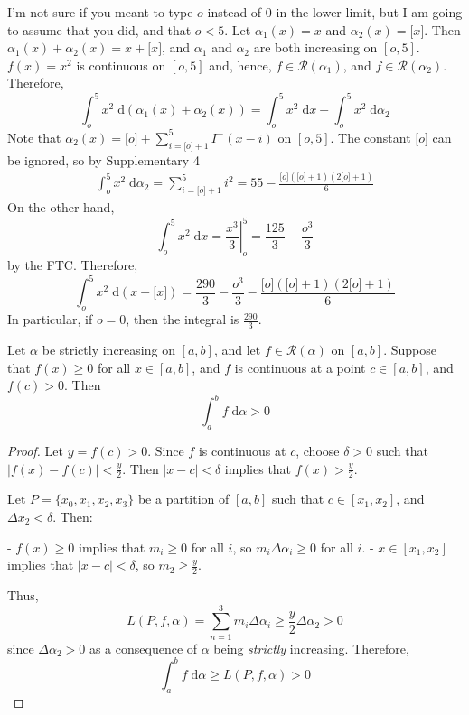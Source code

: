 \documentclass{homework}
\begin{document}
	
	I'm not sure if you meant to type $o$ instead of $0$ in the lower limit, but I am going to assume that you did, and that $o < 5$. Let $\alpha_1(x) = x$ and $\alpha_2(x) = \lbrack x \rbrack$. Then $\alpha_1(x) + \alpha_2(x) = x + \lbrack x \rbrack$, and $\alpha_1$ and $\alpha_2$ are both increasing on $[o, 5]$. $f(x) = x^2$ is continuous on $[o,5]$ and, hence, $f \in \mathscr{R}(\alpha_1)$, and $f \in\mathscr{R}(\alpha_2)$. Therefore,
	$$
	\int_o^5x^2\;\text{d}(\alpha_1(x) + \alpha_2(x)) = \int_o^5x^2\;\text{d}x + \int_o^5x^2\;\text{d}\alpha_2
	$$
	Note that $\alpha_2(x) = \lbrack o \rbrack + \sum_{i=\lbrack o \rbrack + 1}^5 I^+(x-i)$ on $[o,5]$. The constant $\lbrack o \rbrack$ can be ignored, so by Supplementary 4
	$$
	\begin{aligned}
		\int_o^5x^2\;\text{d}\alpha_2 = \sum_{i=\lbrack o\rbrack + 1}^5 i^2 =  55 - \frac{\lbrack o \rbrack(\lbrack o \rbrack + 1)(2\lbrack o \rbrack + 1)}{6}
	\end{aligned}
	$$
	On the other hand,
	$$
	\int_o^5x^2\;\text{d}x = \left.\frac{x^3}{3}\right|_o^5 = \frac{125}{3} - \frac{o^3}{3}
	$$
	by the FTC. Therefore,
	$$
	\int_o^5x^2\;\text{d}(x + \lbrack x \rbrack) = \frac{290}{3} - \frac{o^3}{3} - \frac{\lbrack o \rbrack(\lbrack o \rbrack + 1)(2\lbrack o \rbrack + 1)}{6}
	$$
	In particular, if $o = 0$, then the integral is $\frac{290}{3}$.
	
	
	Let $\alpha$ be strictly increasing on $[a,b]$, and let $f \in \mathscr{R}(\alpha)$ on $[a,b]$. Suppose that $f(x) \ge 0$ for all $x \in [a,b]$, and $f$ is continuous at a point $c \in [a,b]$, and $f(c) > 0$. Then
	$$
	\int_a^bf\;\text{d}\alpha > 0
	$$
	\begin{proof}
		Let $y=  f(c) > 0$. Since $f$ is continuous at $c$, choose $\delta > 0$ such that $|f(x) - f(c)| < \frac{y}{2}$. Then $|x - c| < \delta$ implies that $f(x) > \frac{y}{2}$.
		
		Let $P = \{x_0, x_1,x_2,x_3\}$ be a partition of $[a,b]$ such that $c \in[x_1, x_2]$, and $\Delta x_2 < \delta$. Then:
		
		- $f(x) \ge 0$ implies that $m_i \ge 0$ for all $i$, so $m_i\Delta \alpha_i \ge 0$ for all $i$.
		- $x \in [x_1, x_2]$ implies that $|x -c| < \delta$, so $m_2 \ge \frac{y}{2}$.
		
		Thus,
		$$
		L(P,f,\alpha) = \sum_{n=1}^3 m_i \Delta\alpha_i \ge \frac{y}{2}\Delta \alpha_2 > 0
		$$
		since $\Delta \alpha_2 > 0$ as a consequence of $\alpha$ being \textit{strictly} increasing. Therefore,
		$$
		\int_a^b f\;\text{d}\alpha \ge L(P, f, \alpha) > 0
		$$
	\end{proof}
	
\end{document}
